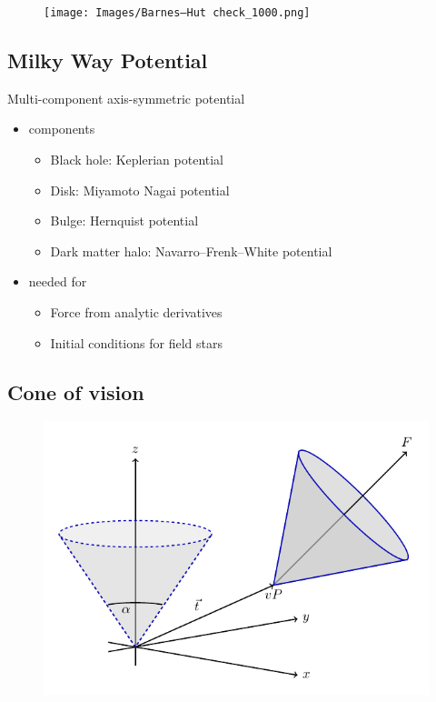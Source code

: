 \documentclass{beamer}
\begin{document}
\begin{frame}
\begin{figure}
\centering
\texttt{[image: Images/Barnes–Hut check\_1000.png]}
\end{figure}
\end{frame}


\subsection{Milky Way Potential}

\begin{frame}

Multi-component axis-symmetric potential

\begin{itemize}
\item components
	\begin{itemize}
	\item Black hole: Keplerian potential
	\item Disk: Miyamoto Nagai potential
	\item Bulge: Hernquist potential
	\item Dark matter halo: Navarro–Frenk–White potential
	\end{itemize}
\item needed for
	\begin{itemize}
	\item Force from analytic derivatives
	\item Initial conditions for field stars
	\end{itemize}
\end{itemize}

\end{frame}

\subsection{Cone of vision}

\begin{frame}
\begin{figure}
\centering
\includegraphics[width=0.9\linewidth]{Images/cone.pdf}
\end{figure}
\end{frame}
\end{document}
